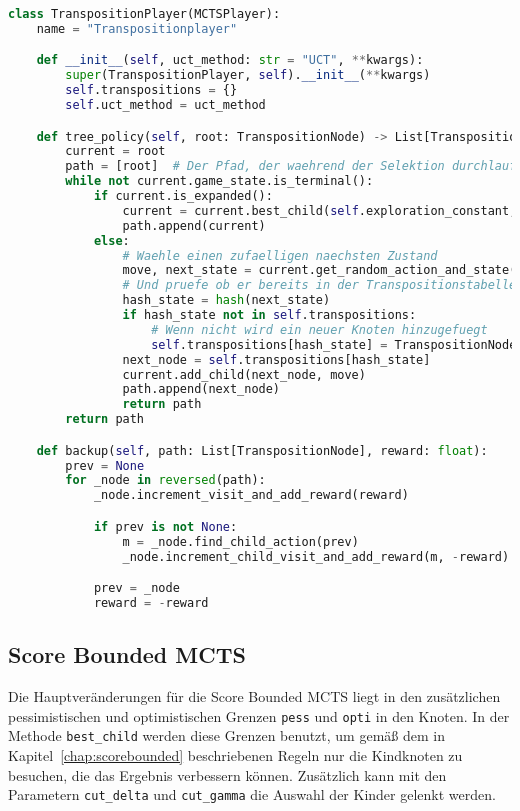 \begin{lstlisting}[language=Python,label={lst:transposition-player}]
class TranspositionPlayer(MCTSPlayer):
    name = "Transpositionplayer"

    def __init__(self, uct_method: str = "UCT", **kwargs):
        super(TranspositionPlayer, self).__init__(**kwargs)
        self.transpositions = {}
        self.uct_method = uct_method

    def tree_policy(self, root: TranspositionNode) -> List[TranspositionNode]:
        current = root
        path = [root]  # Der Pfad, der waehrend der Selektion durchlaufen wird
        while not current.game_state.is_terminal():
            if current.is_expanded():
                current = current.best_child(self.exploration_constant, uct_method=self.uct_method)
                path.append(current)
            else:
                # Waehle einen zufaelligen naechsten Zustand
                move, next_state = current.get_random_action_and_state()
                # Und pruefe ob er bereits in der Transpositionstabelle enthalten ist
                hash_state = hash(next_state)
                if hash_state not in self.transpositions:
                    # Wenn nicht wird ein neuer Knoten hinzugefuegt
                    self.transpositions[hash_state] = TranspositionNode(game_state=next_state, parent=current)
                next_node = self.transpositions[hash_state]
                current.add_child(next_node, move)
                path.append(next_node)
                return path
        return path

    def backup(self, path: List[TranspositionNode], reward: float):
        prev = None
        for _node in reversed(path):
            _node.increment_visit_and_add_reward(reward)

            if prev is not None:
                m = _node.find_child_action(prev)
                _node.increment_child_visit_and_add_reward(m, -reward)

            prev = _node
            reward = -reward
\end{lstlisting}

\subsection{Score Bounded MCTS}

Die Hauptveränderungen für die Score Bounded MCTS liegt in den zusätzlichen pessimistischen und optimistischen Grenzen \verb|pess| und \verb|opti| in den Knoten.
In der Methode \verb|best_child| werden diese Grenzen benutzt, um gemäß dem in Kapitel~\ref{chap:scorebounded} beschriebenen Regeln nur die Kindknoten zu besuchen, die das Ergebnis verbessern können.
Zusätzlich kann mit den Parametern \verb|cut_delta| und \verb|cut_gamma| die Auswahl der Kinder gelenkt werden.

